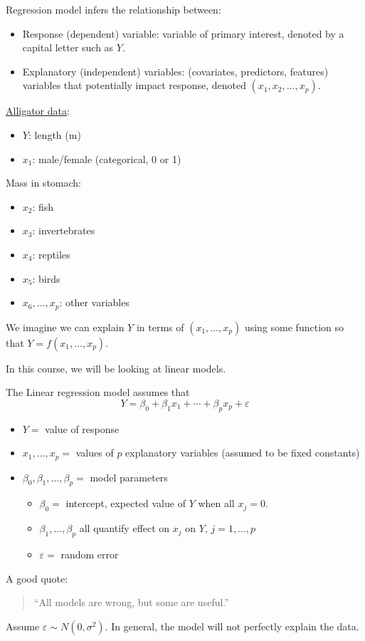 Regression model infers the relationship between:
\begin{itemize}
    \item Response (dependent) variable:
          variable of primary interest, denoted by
          a capital letter such as $ Y $.
    \item Explanatory (independent) variables:
          (covariates, predictors, features) variables
          that potentially impact response,
          denoted $ (x_1,x_2,\ldots,x_p) $.
\end{itemize}
\underline{Alligator data}:
\begin{itemize}
    \item $ Y $: length (m)
    \item $ x_1 $: male/female (categorical, 0 or 1)
\end{itemize}
Mass in stomach:
\begin{itemize}
    \item $ x_2 $: fish
    \item $ x_3 $: invertebrates
    \item $ x_4 $: reptiles
    \item $ x_5 $: birds
    \item $ x_6,\ldots,x_p $: other variables
\end{itemize}
We imagine we can explain $ Y $ in terms
of $ (x_1,\ldots,x_p) $ using some function
so that $ Y=f(x_1,\ldots,x_p) $.

In this course, we will be looking at linear models.

The Linear regression model assumes that
\[ Y=\beta_0+\beta_1x_1+\cdots+\beta_p x_p+\varepsilon \]
\begin{itemize}
    \item $ Y =$ value of response
    \item $ x_1,\ldots,x_p =$ values of $ p $ explanatory variables
          (assumed to be fixed constants)
    \item $ \beta_0,\beta_1,\ldots,\beta_p = $ model parameters
          \begin{itemize}
              \item $ \beta_0 = $ intercept, expected value of $ Y $
                    when all $ x_j=0 $.
              \item $ \beta_1,\ldots,\beta_p $ all quantify effect on $ x_j $
                    on $ Y $, $ j=1,\ldots,p $
              \item $ \varepsilon =$ random error
          \end{itemize}
\end{itemize}
A good quote:
\begin{quote}
    ``All models are wrong, but some are useful.''
\end{quote}
Assume $ \varepsilon \sim N(0,\sigma^2) $.
In general, the model will not perfectly explain the data.

